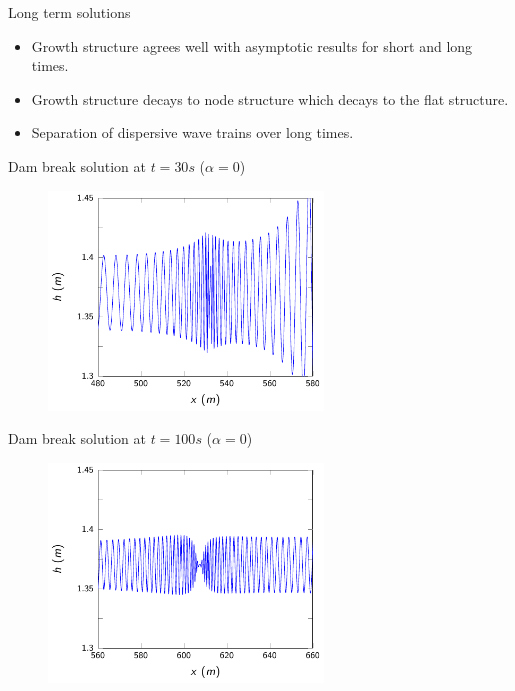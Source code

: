 \documentclass[pdf]{beamer}
\begin{document}
\begin{frame}{Long term solutions}
	\begin{itemize}
		\item Growth structure agrees well with asymptotic results for short and long times.
		\item Growth structure decays to node structure which decays to the flat structure.
		\item Separation of dispersive wave trains over long times.
	\end{itemize}
\end{frame}

\begin{frame}{Dam break solution at $t=30s$ ($\alpha = 0$)}
		\begin{figure}
			\includegraphics[width=0.65\textwidth]{./Pictures/Results/Example/G30.pdf}
		\end{figure}

\end{frame}

\begin{frame}{Dam break solution at $t=100s$ ($\alpha = 0$)}
	\begin{figure}
		\includegraphics[width=0.65\textwidth]{./Pictures/Results/Example/N100.pdf}
	\end{figure}
	
\end{frame}
\end{document}
